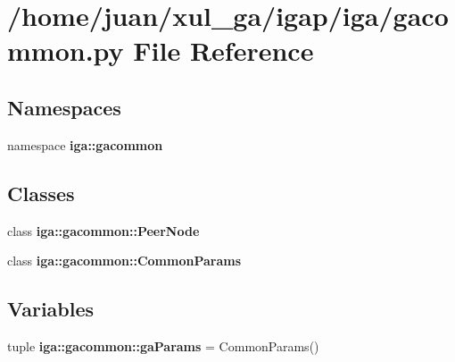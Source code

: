 \section{/home/juan/xul\_\-ga/igap/iga/gacommon.py File Reference}
\label{gacommon_8py}
\subsection*{Namespaces}
\begin{CompactItemize}
\item 
namespace {\bf iga::gacommon}
\end{CompactItemize}
\subsection*{Classes}
\begin{CompactItemize}
\item 
class {\bf iga::gacommon::PeerNode}
\item 
class {\bf iga::gacommon::CommonParams}
\end{CompactItemize}
\subsection*{Variables}
\begin{CompactItemize}
\item 
tuple {\bf iga::gacommon::gaParams} = CommonParams()
\end{CompactItemize}
